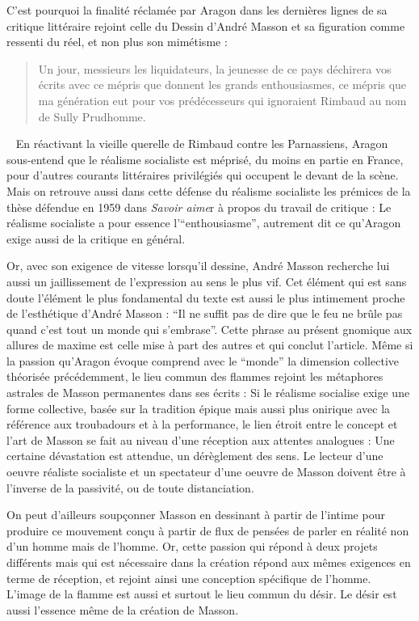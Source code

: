 {	C’est pourquoi la finalité réclamée par Aragon dans les dernières lignes de sa critique littéraire rejoint celle du Dessin d’André Masson et sa figuration comme ressenti du réel, et non plus son mimétisme : 

\begin{quote}
Un jour, messieurs les liquidateurs, la jeunesse de ce pays déchirera vos écrits avec ce mépris que donnent les grands enthousiasmes, ce mépris que ma génération eut pour vos prédécesseurs qui ignoraient Rimbaud au nom de Sully Prudhomme. 	
\end{quote}
 
	 En réactivant la vieille querelle de Rimbaud contre les Parnassiens, Aragon sous-entend que le réalisme socialiste est méprisé, du moins en partie en France, pour d’autres courants littéraires privilégiés qui occupent le devant de la scène. Mais on retrouve aussi dans cette défense du réalisme socialiste les prémices de la thèse défendue en 1959 dans \emph{Savoir aime}r à propos du travail de critique : Le réalisme socialiste a pour essence l’\enquote{enthousiasme}, autrement dit ce qu’Aragon exige aussi de la critique en général.  

	Or, avec son exigence de vitesse lorsqu’il dessine, André Masson recherche lui aussi un jaillissement de l’expression au sens le plus vif. Cet élément qui est sans doute l’élément le plus fondamental du texte est aussi le plus intimement proche de l’esthétique d’André Masson : \enquote{Il ne suffit pas de dire que le feu ne brûle pas quand c’est tout un monde qui s’embrase}. Cette phrase au présent gnomique aux allures de maxime est celle mise à part des autres et qui conclut l’article. Même si la passion qu’Aragon évoque comprend avec le \enquote{monde} la dimension collective théorisée précédemment, le lieu commun des flammes rejoint les métaphores astrales de Masson permanentes dans ses écrits : Si le réalisme socialise exige une forme collective, basée sur la tradition épique mais aussi plus onirique avec la référence aux troubadours et à la performance, le lien étroit entre le concept et l’art de Masson se fait au niveau d’une réception aux attentes analogues : Une certaine dévastation est attendue, un dérèglement des sens. Le lecteur d’une oeuvre réaliste socialiste et un spectateur d’une oeuvre de Masson doivent être à l’inverse de la passivité, ou de toute distanciation. 

	On peut d’ailleurs soupçonner Masson en dessinant à partir de l’intime pour produire ce mouvement conçu à partir de flux de pensées de parler en réalité non d’un homme mais de l’homme. Or, cette passion qui répond à deux projets différents mais qui est nécessaire dans la création répond aux mêmes exigences en terme de réception, et rejoint ainsi une conception spécifique de l’homme. L’image de la flamme est aussi et surtout le lieu commun du désir. Le désir est aussi l’essence même de la création de Masson. 

}
